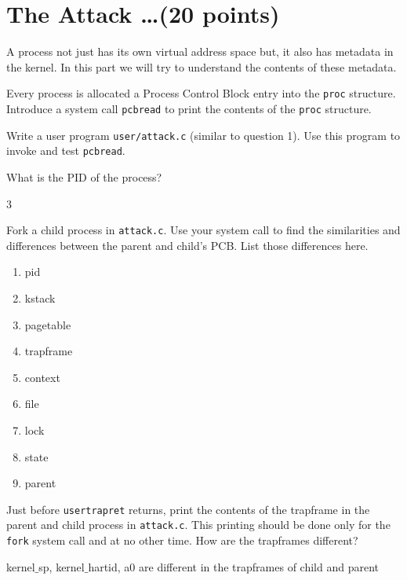\documentclass[11pt]{exam}
\begin{document}
\section{The Attack \ldots (20 points)}
A process not just has its own virtual address space but, it also has metadata in the kernel. In this part we will try to understand the contents of these metadata.

\begin{questions}
\question[5] Every process is allocated a Process Control Block entry into the {\tt proc} structure. Introduce a system call {\tt pcbread} to print the contents of the {\tt proc} structure.

Write a user program {\tt user/attack.c} (similar to question 1). Use this program to invoke and test {\tt pcbread}. 

What is the PID of the process?
\begin{solution}

3

\end{solution}

\question[5] Fork a child process in {\tt attack.c}. Use your system call to find the similarities and differences between the parent and child's PCB. List those differences here.
\begin{solution}

\begin{enumerate}
\item pid
\item kstack
\item pagetable
\item trapframe
\item context
\item file
\item lock
\item state
\item parent
\end{enumerate}

\end{solution}


\question[5] Just before {\tt usertrapret} returns, print the contents of the trapframe in the parent and child process in {\tt attack.c}. This printing should be done only for the {\tt fork} system call and at no other time.
How are the trapframes different?
\begin{solution}

kernel$\_$sp, kernel$\_$hartid, a0 are different in the trapframes of child and parent


\end{solution}
\end{questions}
\end{document}
